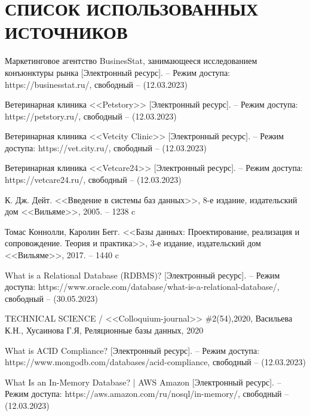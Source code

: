 \section*{СПИСОК ИСПОЛЬЗОВАННЫХ ИСТОЧНИКОВ}

\begingroup
\renewcommand{\section}[2]{}
\begin{thebibliography}{}
	
		Маркетинговое агентство  BusinesStat, занимающееся исследованием конъюнктуры рынка [Электронный ресурс]. -- Режим доступа: 
		https://businesstat.ru/,
		свободный -- (12.03.2023)
		
		Ветеринарная клиника <<Petstory>> [Электронный ресурс]. -- Режим доступа:  https://petstory.ru/,
		свободный -- (12.03.2023)
		
		Ветеринарная клиника <<Vetcity Clinic>> [Электронный ресурс]. -- Режим доступа:  https://vet.city.ru/,
		свободный -- (12.03.2023)
		
		Ветеринарная клиника <<Vetcare24>> [Электронный ресурс]. -- Режим доступа: https://vetcare24.ru/,
		свободный -- (12.03.2023)
			
		К. Дж. Дейт.
		<<Введение в системы баз данных>>, 8-е издание, издательский дом <<Вильяме>>,
		2005. -- 1238 c 
		
		Томас Коннолли, Каролин Бегг.
		<<Базы данных: Проектирование, реализация и сопровождение. Теория и практика>>, 3-е издание, издательский дом <<Вильяме>>,
		2017. -- 1440 c
		
		
		What is a Relational Database (RDBMS)? [Электронный ресурс]. -- Режим доступа: https://www.oracle.com/database/what-is-a-relational-database/, свободный -- (30.05.2023)
		

		TECHNICAL SCIENCE / <<Colloquium-journal>> \#2(54),2020,
		Васильева К.Н., Хусаинова Г.Я,
		Реляционные базы данных,
		2020

		What is ACID Compliance? [Электронный ресурс]. -- Режим доступа: 	https://www.mongodb.com/databases/acid-compliance,
		свободный -- (12.03.2023)
		
		What Is an In-Memory Database? | AWS Amazon [Электронный ресурс]. -- Режим доступа: https://aws.amazon.com/ru/nosql/in-memory/,
		свободный -- (12.03.2023)
		

\end{thebibliography}

